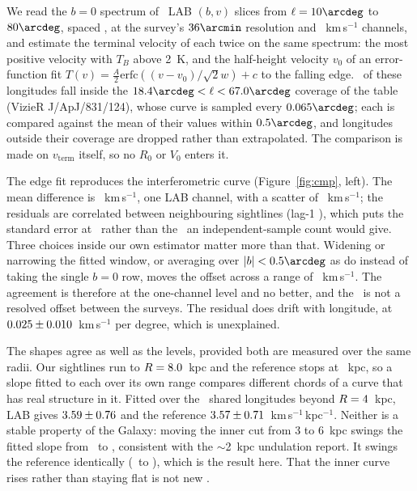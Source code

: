 \documentclass[RNAAS]{aastex631}
\begin{document}
We read the $b=0$ spectrum of \hiNlong\ LAB $(b,v)$ slices from $\ell=10\arcdeg$ to $80\arcdeg$,
spaced \hiStep\arcdeg, at the survey's $36\arcmin$ resolution and \hiRealChannel~km\,s$^{-1}$
channels, and estimate the terminal velocity of each twice on the same spectrum: the most
positive velocity with $T_B$ above 2~K, and the half-height velocity $v_0$ of an error-function
fit $T(v)=\frac{A}{2}\mathrm{erfc}((v-v_0)/\sqrt{2}w)+c$ to the falling edge. \hiRealRefN\ of
these longitudes fall inside the $18.4\arcdeg<\ell<67.0\arcdeg$ coverage of the
\citet{mccluregriffiths2016} table (VizieR J/ApJ/831/124), whose curve is sampled every
$0.065\arcdeg$; each is compared against the mean of their values within $0.5\arcdeg$, and
longitudes outside their coverage are dropped rather than extrapolated. The comparison is made
on $v_\mathrm{term}$ itself, so no $R_0$ or $V_0$ enters it.

The edge fit reproduces the interferometric curve (Figure~\ref{fig:cmp}, left). The mean
difference is \hiRealRefEdgeOffset~km\,s$^{-1}$, one LAB channel, with a scatter of
\hiRealRefEdgeOffsetSd~km\,s$^{-1}$; the residuals are correlated between neighbouring
sightlines (lag-1 \hiRealResidAuto), which puts the standard error at
\hiRealRefEdgeOffsetSemCorr\ rather than the \hiRealRefEdgeOffsetSem\ an independent-sample
count would give. Three choices inside our own estimator matter more than that. Widening or
narrowing the fitted window, or averaging over $|b|<0.5\arcdeg$ as
\citet{mccluregriffiths2016} do instead of taking the single $b=0$ row, moves the offset across
a range of \hiRealEstSysSpan~km\,s$^{-1}$. The agreement is therefore at the one-channel level
and no better, and the \hiRealRefEdgeOffset\ is not a resolved offset between the surveys. The
residual does drift with longitude, at
$0.025\pm0.010$~km\,s$^{-1}$ per degree, which is unexplained.

The shapes agree as well as the levels, provided both are measured over the same radii. Our
sightlines run to $R=8.0$~kpc and the reference stops at \hiRealRefRmax~kpc, so a slope
fitted to each over its own range compares different chords of a curve that has real structure
in it. Fitted over the \hiRealMatchSlopeN\ shared longitudes beyond
$R=4$~kpc, LAB gives $3.59\pm0.76$ and the reference
$3.57\pm0.71$~km\,s$^{-1}$\,kpc$^{-1}$. Neither is a stable
property of the Galaxy: moving the inner cut from 3 to 6~kpc swings the fitted slope from
\hiRealRminSweepLo\ to \hiRealRminSweepHi, consistent with the $\sim$2~kpc undulation
\citet{mccluregriffiths2016} report. It swings the reference identically
(\hiRealRminSweepRefLo\ to \hiRealRminSweepRefHi), which is the result here. That the inner
curve rises rather than staying flat is not new \citep{reiddame2016,davis2026}.
\end{document}
